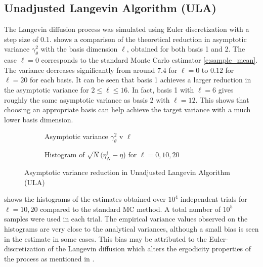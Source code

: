 \subsection*{Unadjusted Langevin Algorithm (ULA)}
The Langevin diffusion process was simulated using Euler discretization with a step size of $0.1$.  shows a comparison of the theoretical reduction in asymptotic variance $\gamma_\theta^2$ with the basis dimension $\ell$, obtained for both basis 1 and 2. The case $\ell=0$ corresponds to the standard Monte Carlo estimator \eqref{e:sample_mean}. The variance decreases significantly from around $7.4$ for $\ell=0$ to $0.12$ for $\ell=20$ for each basis. It can be seen that basis 1 achieves a larger reduction in the asymptotic variance for $2 \leq \ell \leq 16$. In fact, basis 1 with $\ell=6$ gives roughly the same asymptotic variance as basis 2 with $\ell=12$. This shows that choosing an appropriate basis can help achieve the target variance with a much lower basis dimension.

\begin{figure}[h]
	\centering
	\begin{subfigure}{0.45\textwidth}
		\caption{Asymptotic variance $\gamma_\theta^2$ v $\ell$}
		\label{asym_var}
	\end{subfigure}
	\hfill
	\begin{subfigure}{0.45\textwidth}
		\caption{Histogram of $\sqrt{N}(\eta_N^{i} - \eta$) for $\ell=0,10,20$}
		\label{d_all}
	\end{subfigure}
	\label{langevin}
	\caption{Asymptotic variance reduction in Unadjusted Langevin Algorithm (ULA)}
\end{figure}


 shows the histograms of the estimates obtained over $10^4$ independent trials for $\ell= 10,20$ compared to the standard MC method. A total number of $10^5$ samples were used in each trial. The empirical variance values observed on the histograms are very close to the analytical variances, although a small bias is seen in the estimate in some cases. This bias may be attributed to the Euler-discretization of the Langevin diffusion which alters the ergodicity properties of the process as mentioned in \cite{robtwe96}.  %

